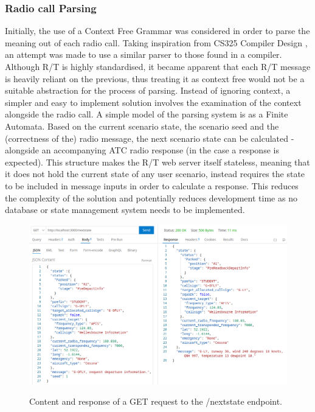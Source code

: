 \subsubsection{Radio call Parsing}
Initially, the use of a Context Free Grammar was considered in order to parse the meaning out of each radio call. Taking inspiration from CS325 Compiler Design \cite{CS325}, an attempt was made to use a similar parser to those found in a compiler. Although R/T is highly standardised, it became apparent that each R/T message is heavily reliant on the previous, thus treating it as context free would not be a suitable abstraction for the process of parsing. Instead of ignoring context, a simpler and easy to implement solution involves the examination of the context alongside the radio call. A simple model of the parsing system is as a Finite Automata. Based on the current scenario state, the scenario seed and the (correctness of the) radio message, the next scenario state can be calculated - alongside an accompanying ATC radio response (in the case a response is expected). This structure makes the R/T web server itself stateless, meaning that it does not hold the current state of any user scenario, instead requires the state to be included in message inputs in order to calculate a response. This reduces the complexity of the solution and potentially reduces development time as no database or state management system needs to be implemented.

\begin{figure}[H]
    \centering
	\includegraphics[scale = 0.48]{../document-resources/images/api-screenshot}
    \label{api-endpoint}
    \caption{Content and response of a GET request to the /nextstate endpoint.}
\end{figure}

